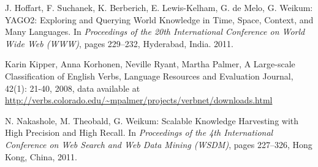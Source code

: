 \documentclass[11pt,a4paper]{article}
\begin{document}
\begin{thebibliography}{99}
 J. Hoffart, F. Suchanek, K. Berberich, E. Lewis-Kelham, G. de Melo, G. Weikum: YAGO2: Exploring and Querying World Knowledge in Time, Space, Context, and Many Languages. In \textit{Proceedings  of the 20th International Conference on World Wide Web (WWW)}, pages 229--232, Hyderabad, India. 2011.

%
%
%
%
%
%
%

 Karin Kipper, Anna Korhonen, Neville Ryant, Martha Palmer,
A Large-scale Classification of English Verbs,
Language Resources and Evaluation Journal, 42(1): 21-40, 2008,
data available at \url{http://verbs.colorado.edu/~mpalmer/projects/verbnet/downloads.html}

 N. Nakashole, M. Theobald, G. Weikum: Scalable Knowledge Harvesting with High Precision and High Recall.
		In \textit{Proceedings of the 4th International Conference on
		 Web Search and Web Data Mining (WSDM)}, pages 227--326, Hong Kong, China, 2011.
		 

\end{thebibliography}
\end{document}
